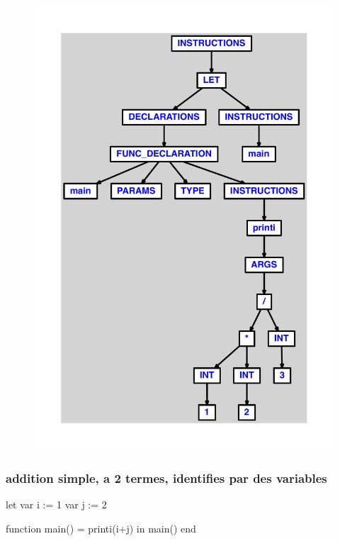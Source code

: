 \documentclass{article}
\begin{document}
\begin{figure}[H]\centering\includegraphics[max width=\textwidth]{ast/ast_50.pdf}\end{figure}\subsubsection{addition simple, a 2 termes, identifies par des variables}
\begin{verbatimtab}
let
	var i := 1
	var j := 2

	function main() = printi(i+j)
in main() end
\end{verbatimtab}
\end{document}
